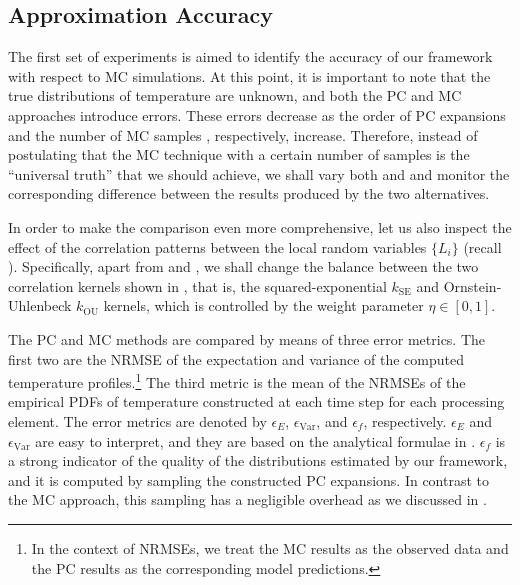 \subsection{Approximation Accuracy}

The first set of experiments is aimed to identify the accuracy of our framework
with respect to MC simulations. At this point, it is important to note that the
true distributions of temperature are unknown, and both the PC and MC approaches
introduce errors. These errors decrease as the order of PC expansions \lc and
the number of MC samples \ns, respectively, increase. Therefore, instead of
postulating that the MC technique with a certain number of samples is the
``universal truth'' that we should achieve, we shall vary both \lc and \ns and
monitor the corresponding difference between the results produced by the two
alternatives.

In order to make the comparison even more comprehensive, let us also inspect the
effect of the correlation patterns between the local random variables $\{ L_i
\}$ (recall ). Specifically, apart from \lc and \ns,
we shall change the balance between the two correlation kernels shown in
, that is, the squared-exponential $k_\mathrm{SE}$
and Ornstein-Uhlenbeck $k_\mathrm{OU}$ kernels, which is controlled by the
weight parameter $\eta \in [0, 1]$.

The PC and MC methods are compared by means of three error metrics. The first
two are the \acf{NRMSE} of the expectation and variance of the computed
temperature profiles.\footnote{In the context of \acp{NRMSE}, we treat the MC
results as the observed data and the PC results as the corresponding model
predictions.} The third metric is the mean of the \acp{NRMSE} of the empirical
PDFs of temperature constructed at each time step for each processing element.
The error metrics are denoted by $\epsilon_E$, $\epsilon_\mathrm{Var}$, and $\epsilon_f$,
respectively. $\epsilon_E$ and $\epsilon_\mathrm{Var}$ are easy to interpret, and they are based
on the analytical formulae in . $\epsilon_f$ is a strong
indicator of the quality of the distributions estimated by our framework, and it
is computed by sampling the constructed PC expansions. In contrast to the MC
approach, this sampling has a negligible overhead as we discussed in
.


